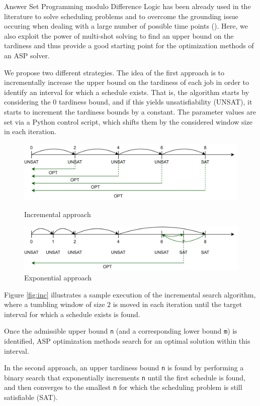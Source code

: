\documentclass[submission,copyright,creativecommons]{eptcs}
\begin{document}
Answer Set Programming modulo Difference Logic has been already used in the literature to solve scheduling problems and to overcome the grounding issue occuring when dealing with a large number of possible time points (\cite{DBLP:conf/lpnmr/AbelsJOSTW19}). Here, we also exploit the power of multi-shot solving to find an upper bound on the tardiness and thus provide a good starting point for the optimization methods of an ASP solver. 

We propose two different strategies. The idea of the first approach is to incrementally increase the upper bound on the tardiness of each job in order to identify an interval for which a schedule exists.
%
That is, the algorithm starts by considering the $0$ tardiness bound, and if this yields unsatisfiability (UNSAT), it starts to increment the tardiness bounds by a constant. The parameter values are set via a Python control script, which shifts them by the considered window size in each iteration. 

\begin{figure}[b]
	\centering
	\includegraphics[width=0.5\linewidth]{figures/incremental.pdf}
	\caption{Incremental approach \label{fig:inc}}
        \smallskip %
        \bigskip
	\includegraphics[width=0.5\linewidth]{figures/exponential.pdf}
	\caption{Exponential approach \label{fig:exp}}
\end{figure}

Figure \ref{fig:inc} illustrates a sample execution of the incremental search algorithm, where a tumbling window of size $2$ is moved in each iteration until the target interval for which a schedule exists is found. 

Once the admissible upper bound \lstinline{n} (and a corresponding lower bound \lstinline{m}) is identified, ASP optimization methods search for an optimal solution within this interval.

In the second approach, an upper tardiness bound \lstinline{n} is found by performing a binary search that exponentially increments \lstinline{n} until the first schedule is found, and then converges to the smallest \lstinline{n} for which the scheduling problem is still satisfiable (SAT).
\end{document}
